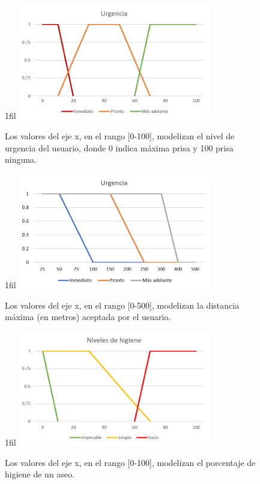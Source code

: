\documentclass[13pt,a4paper]{article}
\makeatletter
\newcommand*{\centerfloat}{%
  \parindent \z@
  \leftskip \z@ \@plus 1fil \@minus \textwidth
  \rightskip\leftskip
  \parfillskip \z@skip}
\makeatother
\begin{document}
\begin{figure}[H]
  \centerfloat
  \includegraphics[width=0.75\textwidth]{img/1.png}
  \caption{Los valores del eje x, en el rango [0-100], modelizan el nivel de urgencia del usuario, donde 0 indica máxima prisa y 100 prisa ninguna.}
  \label{urgencia}
\end{figure}

\begin{figure}[H]
  \centerfloat
  \includegraphics[width=0.75\textwidth]{img/2.png}
  \caption{Los valores del eje x, en el rango [0-500], modelizan la distancia máxima (en metros) aceptada por el usuario.}
  \label{distancia}
\end{figure}

\begin{figure}[H]
  \centerfloat
  \includegraphics[width=0.75\textwidth]{img/3.png}
  \caption{Los valores del eje x, en el rango [0-100], modelizan el porcentaje de higiene de un aseo.}
  \label{higiene}
\end{figure}
\end{document}
